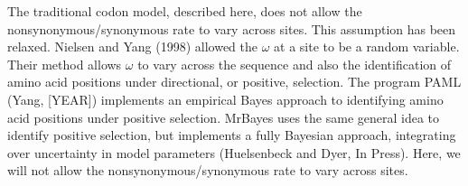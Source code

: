 \documentclass{svmult}
\begin{document}
\begin{description}
The traditional codon model, described here, does not allow the nonsynonymous/synonymous rate to vary across sites. This assumption has been relaxed. Nielsen
and Yang (1998) allowed the $\omega$ at a site to be a random variable. Their method allows $\omega$ to vary across the sequence and also the identification
of amino acid positions under directional, or positive, selection. The program PAML (Yang, [YEAR]) implements an empirical Bayes approach to identifying
amino acid positions under positive selection. MrBayes uses the same general idea to identify positive selection, but implements a fully Bayesian approach, integrating
over uncertainty in model parameters (Huelsenbeck and Dyer, In Press). Here, we will not allow the nonsynonymous/synonymous rate to vary across sites. \\ 


\end{description}
\end{document}
